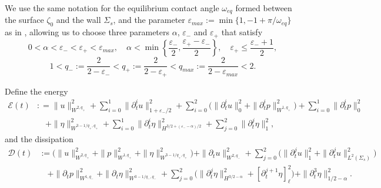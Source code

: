 \documentclass[letterpaper,reqno,10pt,twoside]{amsart}
\theoremstyle{definition}
\theoremstyle{remark}
\def\p{\partial}
\def\om{\omega}
\begin{document}
	
	We use the same notation for the equilibrium contact angle $\om_{eq}$ formed between the surface $\zeta_0$ and the wall $\Sigma_s$, and the parameter $\varepsilon_{max} := \min\{1, -1+ \pi/\om_{eq}\}$ as in \cite{GT2020},  allowing us to choose three parameters $\alpha$, $\varepsilon_-$ and $\varepsilon_+$ that satisfy
	\begin{equation}\label{parameters}
		0<\alpha<\varepsilon_-<\varepsilon_+<\varepsilon_{max},\quad \alpha<\min\left\{\frac{\varepsilon_-}2, \frac{\varepsilon_+-\varepsilon_-}2\right\}, \quad \varepsilon_+\leq \frac{\varepsilon_-+1}2,
	\end{equation}
	\begin{equation}\label{eq:parameter2}
		1< q_-:=\frac{2}{2-\varepsilon_-} < q_+:=\frac{2}{2-\varepsilon_+} <q_{max}:=\frac{2}{2-\varepsilon_{max}} < 2.
	\end{equation}
	
	Define the energy
	\begin{equation}\label{energy}
		\begin{aligned}
			\mathcal{E}(t)&: =\|u\|_{W^{2,q_+}}^2+\sum_{i=0}^{1}\|\p_t^{i}u\|_{1+\varepsilon_-/2}^2+\sum_{i=0}^2 \Big( \|\p_t^iu\|_0^2+\|\p_{t}^{i}p\|_{W^{1,q_+}}^2\Big) + \sum_{i=0}^{1}\|\p_t^{i}p\|_0^2\\&\quad+\|\eta\|_{W^{3-1/q_+, q_+}}^2+\sum_{i=0}^{1}\|\p_t^{i}\eta\|_{H^{3/2+(\varepsilon_--\alpha)/2}}^2+\sum_{j=0}^2\|\p_t^j\eta\|_1^2,
		\end{aligned}
	\end{equation}
	and the dissipation
	\begin{equation}\label{dissipation}
		\begin{aligned}
			\mathcal{D}(t)&:=\Big(\|u\|_{W^{2,q_+}}^2+\|p\|_{W^{1,q_{+}}}^{2}+\|\eta\|_{W^{3-1/q_+, q_+}}^2\Big)+\|\partial_{t}u\|^{2}_{W^{2,q_{-}}}+\sum_{j=0}^2\Big(\|\p_t^ju\|_1^2+\|\p_t^ju\|_{L^2(\Sigma_s)}^2\Big)\\&\quad
			+\|\p_tp\|_{W^{1,q_-}}^2
			+\|\p_t\eta\|_{W^{3-1/q_-, q_-}}^2+\sum_{j=0}^2\Big(\|\p_t^j\eta\|_{H^{3/2-\alpha}}^2+[\p_t^{j+1}\eta]_\ell^2\Big)+\|\p_t^3\eta\|_{1/2-\alpha}^2.
		\end{aligned}
	\end{equation}
	
\end{document}
